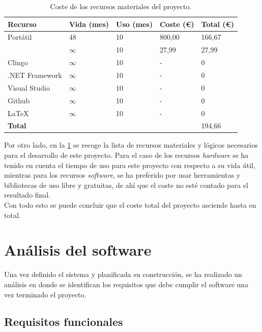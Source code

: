 \begin{table}[!h]
	\centering
	\begin{tabularx}{\textwidth}{ l X X X X }
		\bfseries{Recurso} & \bfseries{Vida (mes)} & \bfseries{Uso (mes)} & \bfseries{Coste (\euro)} & \bfseries{Total (\euro)} \\
		\hline
		Portátil & 48 & 10 & 800,00 & 166,67 \\
		\cities & $\infty$ & 10 & 27,99 & 27,99 \\
		Clingo & $\infty$ & 10 & - & 0 \\
		.NET Framework & $\infty$ & 10 & - & 0 \\
		Visual Studio & $\infty$ & 10 & - & 0 \\
		Github & $\infty$ & 10 & - & 0 \\
		LaTeX & $\infty$ & 10 & - & 0 \\
		\hline
		\bfseries{Total} & & & & 194,66 \\
		\hline
	\end{tabularx}
	\caption{Coste de los recursos materiales del proyecto.}\label{table:costematerial}
\end{table}

Por otro lado, en la \ref{table:costematerial} se recoge la lista de recursos materiales y lógicos necesarios para el desarrollo de este proyecto. Para el caso de los recursos \textit{hardware} se ha tenido en cuenta el tiempo de uso para este proyecto con respecto a su vida útil, mientras para los recursos \textit{software}, se ha preferido por usar herramientas y bibliotecas de uso libre y gratuitas, de ahí que el coste no esté contado para el resultado final. \\

Con todo esto se puede concluir que el coste total del proyecto asciende hasta  en total.

\section{Análisis del software}

Una vez definido el sistema y planificada su construcción, se ha realizado un análisis en donde se identifican los requisitos que debe cumplir el software una vez terminado el proyecto.

\subsection{Requisitos funcionales}
\label{subsec:funcrequirements}

